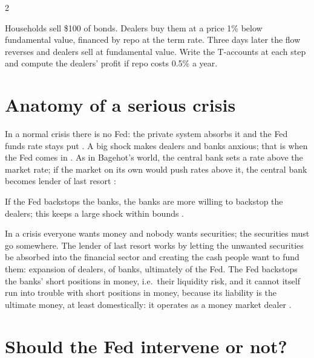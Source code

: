 \begin{paracol}{2}
\begin{exercise}
Households sell \$100 of bonds. Dealers buy them at a price 1\% below fundamental value, financed by repo at the term rate. Three days later the flow reverses and dealers sell at
fundamental value. Write the T-accounts at each step and compute the dealers' profit if repo costs 0.5\% a year.
\end{exercise}

\section{Anatomy of a serious crisis}\label{sec:lr-seriouscrisis}

In a normal crisis there is no Fed: the private system absorbs it and the Fed funds rate stays put . A big shock makes dealers and banks anxious; that is
when the Fed comes in . As in Bagehot's world, the central bank sets a rate above the market rate; if the market on its own would push rates above
it, the central bank becomes lender of last resort :
\begin{taccts}
\quad
{}\quad
{}
\end{taccts}
If the Fed backstops the banks, the banks are more willing to backstop the dealers; this keeps a large shock within bounds .

\begin{proposition}
In a crisis everyone wants money and nobody wants securities; the securities must go somewhere. The lender of last resort works by letting the unwanted securities be absorbed
into the financial sector and creating the cash people want to fund them: expansion of dealers, of banks, ultimately of the Fed. The Fed backstops the banks' short positions
in money, i.e.\ their liquidity risk, and it cannot itself run into trouble with short positions in money, because its liability is the ultimate money, at least domestically:
it operates as a money market dealer .
\end{proposition}

\section{Should the Fed intervene or not?}\label{sec:lr-should}


\end{paracol}
